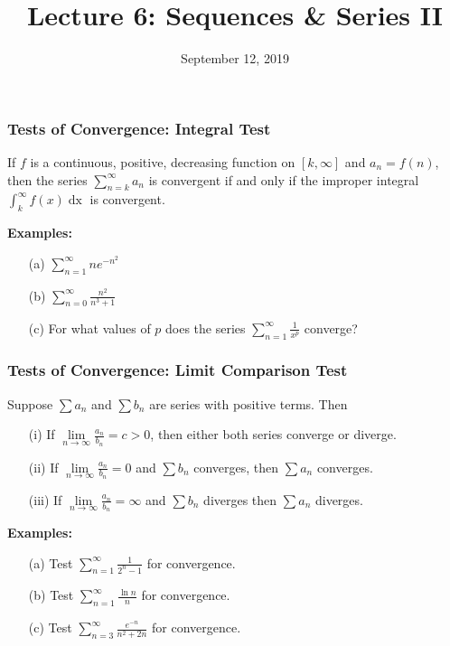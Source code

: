 \documentclass{beamer}
\title{Lecture 6: Sequences \& Series II}
\date{September 12, 2019}
\begin{document}
	
\frame{\titlepage}



\begin{frame}
\frametitle{Tests of Convergence: Integral Test}
If $f$ is a continuous, positive, decreasing function on $[k,\infty]$ and $a_n = f(n)$, then the series $\sum_{n=k}^\infty a_n$ is convergent if and only if the improper integral $\int_k^\infty f(x)\mathop{dx}$ is convergent.

\vspace{12pt}
\textbf{Examples:}
\begin{itemize}
	\item[(a)] $\sum_{n=1}^\infty n e^{-n^2}$
	\item[(b)] $\sum_{n=0}^\infty \frac{n^2}{n^3+1}$
	\item[(c)] For what values of $p$ does the series $\sum_{n=1}^\infty \frac{1}{x^p}$ converge?
\end{itemize}
\end{frame}

\begin{frame}
\frametitle{Tests of Convergence: Limit Comparison Test}
Suppose $\sum a_n$ and $\sum  b_n$ are series with positive terms. Then
\begin{itemize}
	\item[(i)] If $\lim\limits_{n \to \infty} \frac{a_n}{b_n} = c> 0$, then either both series converge or diverge.
	\item[(ii)] If $\lim\limits_{n \to \infty} \frac{a_n}{b_n} =  0$ and $\sum  b_n$ converges, then $\sum  a_n$ converges.
	\item[(iii)] If $\lim\limits_{n \to \infty} \frac{a_n}{b_n} =  \infty$ and $\sum  b_n$ diverges then $\sum a_n$ diverges.
\end{itemize}

\vspace{12pt}
\textbf{Examples:}
\begin{itemize}
	\item[(a)] Test $\sum_{n=1}^\infty \frac{1}{2^n-1}$ for convergence.
	\item[(b)] Test $\sum_{n=1}^\infty \frac{\ln n}{n}$ for convergence.
	\item[(c)] Test $\sum_{n=3}^\infty \frac{e^{-n}}{n^2 + 2n}$ for convergence.
\end{itemize}
\end{frame}
\end{document}
